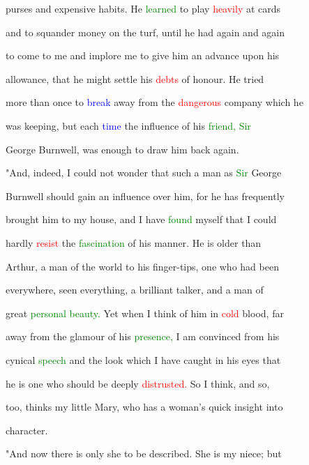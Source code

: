  purses and expensive habits. He \textcolor{green}{learned} to play \textcolor{red}{heavily} at cards

 and to squander \textcolor{BurntOrange}{money} on the turf, until he had again and again

 to come to me and implore me to give him an \textcolor{BurntOrange}{advance} upon his

 allowance, that he might settle his \textcolor{red}{debts} of honour. He tried

 more than once to \textcolor{blue}{break} away from the \textcolor{red}{dangerous} company which he

 was keeping, but each \textcolor{blue}{time} the \textcolor{BurntOrange}{influence} of his \textcolor{green}{friend,} \textcolor{green}{Sir}

 George Burnwell, was enough to draw him back again.



 "And, indeed, I could not wonder that such a man as \textcolor{green}{Sir} George

 Burnwell should \textcolor{BurntOrange}{gain} an \textcolor{BurntOrange}{influence} over him, for he has frequently

 brought him to my house, and I have \textcolor{green}{found} myself that I could

 hardly \textcolor{red}{resist} the \textcolor{green}{fascination} of his manner. He is older than

 Arthur, a man of the world to his finger-tips, one who had been

 everywhere, seen everything, a \textcolor{BurntOrange}{brilliant} talker, and a man of

 great \textcolor{green}{personal} \textcolor{green}{beauty.} Yet when I think of him in \textcolor{red}{cold} blood, far

 away from the glamour of his \textcolor{green}{presence,} I am \textcolor{BurntOrange}{convinced} from his

 cynical \textcolor{green}{speech} and the look which I have caught in his eyes that

 he is one who should be deeply \textcolor{red}{distrusted.} So I think, and so,

 too, thinks my little Mary, who has a woman's quick insight into

 character.



 "And now there is only she to be described. She is my niece; but

